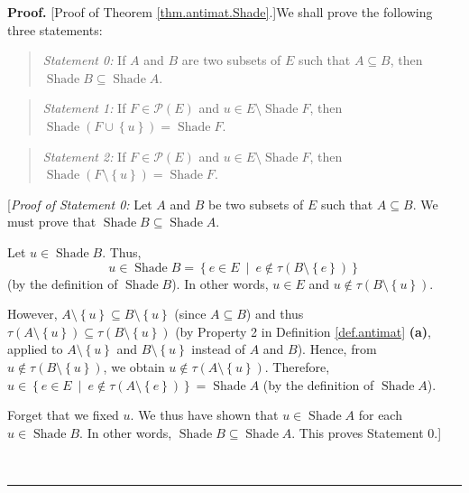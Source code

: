 \documentclass[numbers=enddot,12pt,final,onecolumn]{scrartcl}%
\theoremstyle{definition}
\newenvironment{statement}{\begin{quote}}{\end{quote}}
\newenvironment{proof}[1][Proof]{\noindent\textbf{#1.} }{\ \rule{0.5em}{0.5em}}
\begin{document}
\begin{proof}
[Proof of Theorem \ref{thm.antimat.Shade}.]We shall prove the following three statements:

\begin{statement}
\textit{Statement 0:} If $A$ and $B$ are two subsets of $E$ such that
$A\subseteq B$, then $\operatorname*{Shade}B\subseteq\operatorname*{Shade}A$.
\end{statement}

\begin{statement}
\textit{Statement 1:} If $F\in\mathcal{P}\left(  E\right)  $ and $u\in
E\setminus\operatorname*{Shade}F$, then $\operatorname*{Shade}\left(
F\cup\left\{  u\right\}  \right)  =\operatorname*{Shade}F$.
\end{statement}

\begin{statement}
\textit{Statement 2:} If $F\in\mathcal{P}\left(  E\right)  $ and $u\in
E\setminus\operatorname*{Shade}F$, then $\operatorname*{Shade}\left(
F\setminus\left\{  u\right\}  \right)  =\operatorname*{Shade}F$.
\end{statement}

[\textit{Proof of Statement 0:} Let $A$ and $B$ be two subsets of $E$ such
that $A\subseteq B$. We must prove that $\operatorname*{Shade}B\subseteq
\operatorname*{Shade}A$.

Let $u\in\operatorname*{Shade}B$. Thus,%
\[
u\in\operatorname*{Shade}B=\left\{  e\in E\ \mid\ e\notin\tau\left(
B\setminus\left\{  e\right\}  \right)  \right\}
\]
(by the definition of $\operatorname*{Shade}B$). In other words, $u\in E$ and
$u\notin\tau\left(  B\setminus\left\{  u\right\}  \right)  $.

However, $A\setminus\left\{  u\right\}  \subseteq B\setminus\left\{
u\right\}  $ (since $A\subseteq B$) and thus $\tau\left(  A\setminus\left\{
u\right\}  \right)  \subseteq\tau\left(  B\setminus\left\{  u\right\}
\right)  $ (by Property 2 in Definition \ref{def.antimat} \textbf{(a)},
applied to $A\setminus\left\{  u\right\}  $ and $B\setminus\left\{  u\right\}
$ instead of $A$ and $B$). Hence, from $u\notin\tau\left(  B\setminus\left\{
u\right\}  \right)  $, we obtain $u\notin\tau\left(  A\setminus\left\{
u\right\}  \right)  $. Therefore, $u\in\left\{  e\in E\ \mid\ e\notin%
\tau\left(  A\setminus\left\{  e\right\}  \right)  \right\}
=\operatorname*{Shade}A$ (by the definition of $\operatorname*{Shade}A$).

Forget that we fixed $u$. We thus have shown that $u\in\operatorname*{Shade}A$
for each $u\in\operatorname*{Shade}B$. In other words, $\operatorname*{Shade}%
B\subseteq\operatorname*{Shade}A$. This proves Statement 0.]


\end{proof}
\end{document}
